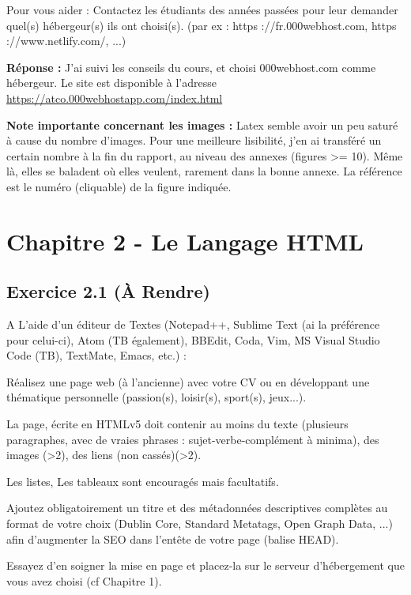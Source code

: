 \documentclass[11pt]{article}
\begin{document}
Pour vous aider : Contactez les étudiants des années passées pour leur demander quel(s) hébergeur(s) ils ont choisi(s). (par ex : https ://fr.000webhost.com, https ://www.netlify.com/, ...)

\medskip

\textbf{Réponse :} J’ai suivi les conseils du cours, et choisi 000webhost.com comme hébergeur. Le site est disponible à l’adresse \url{https://atco.000webhostapp.com/index.html} 

\textbf{Note importante concernant les images :} Latex semble avoir un peu saturé à cause du nombre d’images. Pour une meilleure lisibilité, j’en ai transféré un certain nombre à la fin du rapport, au niveau des annexes (figures >= 10). Même là, elles se baladent où elles veulent, rarement dans la bonne annexe. La référence est le numéro (cliquable) de la figure indiquée.

\section*{Chapitre 2 - Le Langage HTML}

	\subsection*{Exercice 2.1 (À Rendre)}
	
	A L’aide d’un éditeur de Textes (Notepad++, Sublime Text (ai la préférence pour celui-ci), Atom (TB également), BBEdit, Coda, Vim, MS Visual Studio Code (TB), TextMate, Emacs, etc.) :
 
Réalisez une page web (à l’ancienne) avec votre CV ou en développant une thématique personnelle (passion(s), loisir(s), sport(s), jeux...).

La page, écrite en HTMLv5 doit contenir au moins du texte (plusieurs paragraphes, avec de vraies phrases : sujet-verbe-complément à minima), des images (>2), des liens (non cassés)(>2).

Les listes, Les tableaux sont encouragés mais facultatifs.

Ajoutez obligatoirement un titre et des métadonnées descriptives complètes au format de votre choix (Dublin Core, Standard Metatags, Open Graph Data, ...) afin d’augmenter la SEO dans l’entête de votre page (balise HEAD).

Essayez d’en soigner la mise en page et placez-la sur le serveur d’hébergement que vous avez choisi (cf Chapitre 1).
\end{document}
